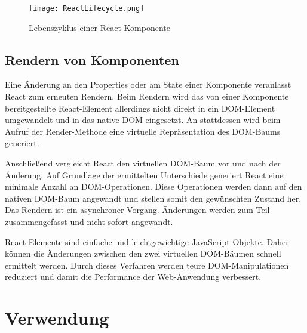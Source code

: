
\begin{figure}
	\centering
	\texttt{[image: ReactLifecycle.png]}
	\caption{Lebenszyklus einer  React-Komponente} 
	\label{fig:LifecyleComponent}
\end{figure}



\subsection{Rendern von Komponenten}
\label{Rendern}
Eine Änderung an den Properties oder am State einer Komponente veranlasst React zum erneuten Rendern. Beim Rendern wird das von einer Komponente bereitgestellte React-Element allerdings nicht direkt in ein DOM-Element umgewandelt und in das native DOM eingesetzt. An stattdessen wird beim Aufruf der Render-Methode eine virtuelle Repräsentation des DOM-Baums generiert.

Anschließend vergleicht React den virtuellen DOM-Baum vor und nach der Änderung. Auf Grundlage der ermittelten Unterschiede generiert React eine minimale Anzahl an DOM-Operationen.  Diese Operationen werden dann auf den nativen DOM-Baum angewandt und stellen somit den gewünschten Zustand her. Das Rendern ist ein asynchroner Vorgang. Änderungen werden zum Teil zusammengefasst und nicht sofort angewandt.

React-Elemente sind einfache und leichtgewichtige JavaScript-Objekte. Daher können die Änderungen zwischen den zwei virtuellen DOM-Bäumen schnell ermittelt werden. Durch dieses Verfahren werden teure DOM-Manipulationen reduziert und damit die Performance der Web-Anwendung verbessert.\autocites[vgl.][23\psq,60\psq,90\psq]{Zeigermann.2016}[vgl.][53\psq]{Stefanov.2017}[vgl.][]{Facebook.2018}

\section{Verwendung}


